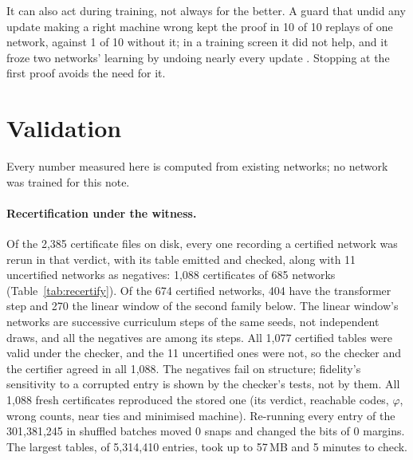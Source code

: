 \documentclass[11pt]{article}
\newcommand{\pn}[2]{#2}
\theoremstyle{definition}
\begin{document}
It can also act during training, not always for the better. A guard that undid any update making a
right machine wrong kept the proof in 10 of 10 replays of one network, against 1 of 10 without it; in
a training screen it did not help, and it froze two networks' learning by undoing nearly every update
\citep[Appendix B]{barkhuizen-2026-learning-transducers-with-proof}. Stopping at the first proof
avoids the need for it.

\section{Validation}
\label{sec:validation}

Every number measured here is computed from existing networks; no network was trained for this note.

\paragraph{Recertification under the witness.} Of the \pn{inventory-files}{2{,}385} certificate files
on disk, every one recording a certified network was rerun in that verdict, with its table emitted and
checked, along with \pn{linear-uncertified-invalid}{11} uncertified networks as negatives:
\pn{recert-jobs}{1{,}088} certificates of \pn{recert-networks}{685} networks (Table~\ref{tab:recertify}).
Of the \pn{recert-certified-networks}{674} certified networks, \pn{recert-transformer-networks}{404} have
the transformer step and \pn{linear-bound-tables}{270} the linear window of the second family below. The
linear window's networks are successive curriculum steps of the same seeds, not independent draws, and all
the negatives are among its steps. All \pn{recert-certified}{1{,}077} certified tables were valid under the
checker, and the \pn{recert-uncertified}{11} uncertified ones were not, so the checker and the certifier
agreed in all \pn{recert-agree}{1{,}088}. The negatives fail on structure; fidelity's sensitivity to a
corrupted entry is shown by the checker's tests, not by them. All \pn{recert-reproduced}{1{,}088} fresh
certificates reproduced the stored one (its verdict, reachable codes, $\varphi$, wrong counts, near ties
and minimised machine). Re-running every entry of the \pn{recert-entries}{301{,}381{,}245} in shuffled
batches moved \pn{recert-moved}{0} snaps and changed the bits of \pn{recert-not-bitwise}{0} margins. The
largest tables, of \pn{recert-largest-entries}{5{,}314{,}410} entries, took up to
\pn{recert-largest-megabytes}{57}\,MB and \pn{recert-largest-check-minutes}{5} minutes to check.
\end{document}
